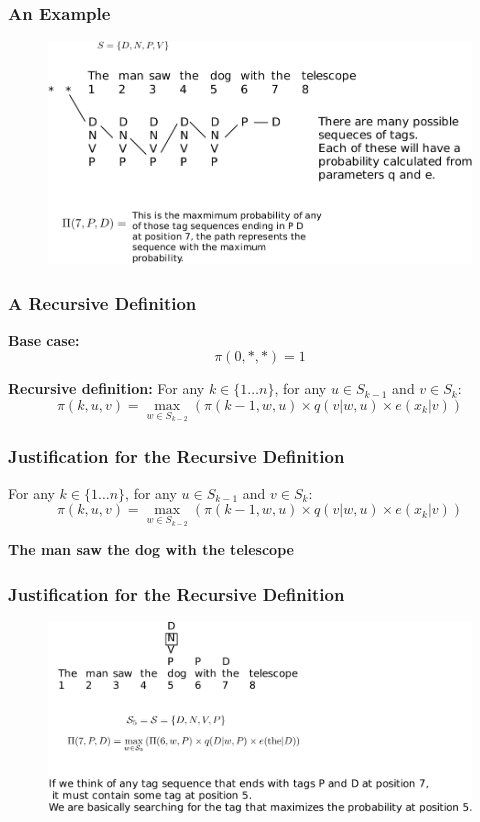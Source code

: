 \documentclass[handout]{beamer}
\begin{document}
\begin{frame}
  \frametitle{An Example}

  \begin{figure}[h]
        	\includegraphics[scale = 0.7]{pics/viterbi1.pdf}
        \end{figure}



\end{frame}

\begin{frame}
  \frametitle{A Recursive Definition}
  \textbf{Base case:}
  \[
    \pi(0, *, *) = 1
  \]

  \textbf{Recursive definition:}
  For any $k \in \{1 \ldots n\}$, for any $u \in S_{k-1}$ and $v \in S_k$:
  \[
    \pi(k, u, v) = \max_{w \in S_{k-2}} (\pi(k - 1, w, u) \times q(v|w, u) \times e(x_k|v))
  \]
\end{frame}

\begin{frame}
  \frametitle{Justification for the Recursive Definition}
  For any $k \in \{1 \ldots n\}$, for any $u \in S_{k-1}$ and $v \in S_k$:
  \[
    \pi(k, u, v) = \max_{w \in S_{k-2}} (\pi(k - 1, w, u) \times q(v|w, u) \times e(x_k|v))
  \]

  \textbf{The man saw the dog with the telescope}
\end{frame}


\begin{frame}
  \frametitle{Justification for the Recursive Definition}

  \begin{figure}[h]
        	\includegraphics[scale = 0.65]{pics/viterbi2.pdf}
        \end{figure}
\end{frame}
\end{document}
